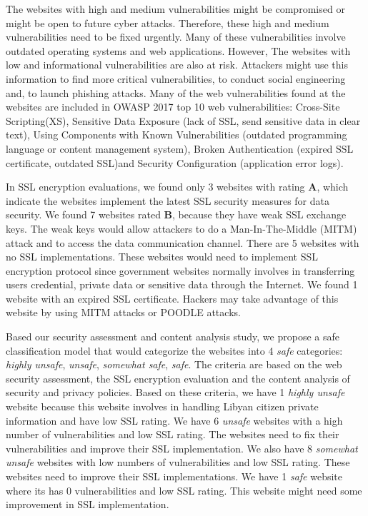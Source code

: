 \documentclass[conference,letterpaper]{IEEEtran}
\begin{document}
The websites with high and medium vulnerabilities might be
compromised or might be open to future cyber attacks.
Therefore, these high and medium vulnerabilities need to be
fixed urgently. Many of these vulnerabilities involve
outdated operating systems and web applications. However,
The websites with low and informational vulnerabilities are
also at risk. Attackers might use this information to find
more critical vulnerabilities, to conduct social engineering
and, to launch phishing attacks. Many of the web
vulnerabilities found at the websites are included in OWASP 2017 top 10 web vulnerabilities: Cross-Site Scripting(XS), Sensitive Data
Exposure (lack of SSL, send sensitive data in clear text),
Using Components with Known Vulnerabilities (outdated
programming language or content management system), Broken
Authentication (expired SSL certificate, outdated SSL)and
Security Configuration (application error logs).

In SSL encryption evaluations, we found only 3 websites with
rating \textbf{A}, which indicate the websites implement the
latest SSL security measures for data security. We found 7
websites rated \textbf{B}, because they have weak SSL
exchange keys. The weak keys would allow attackers to do a
Man-In-The-Middle (MITM) attack and to access the data
communication channel. There are 5 websites with no SSL
implementations. These websites would need to implement SSL
encryption protocol since government websites normally
involves in transferring users credential, private data or
sensitive data through the Internet. We found 1 website with
an expired SSL certificate. Hackers may take advantage of this
website by using MITM attacks or POODLE attacks.

Based our security assessment and content analysis study, we propose
a safe classification model that would categorize the websites into
4 \emph{safe} categories: \emph{highly
	unsafe}, \emph{unsafe}, \emph{somewhat safe}, \emph{safe}.
The criteria are based on the web security assessment, the SSL
encryption evaluation and the content analysis of security and
privacy policies. Based on these criteria, we have 1
\emph{highly unsafe} website because this website involves
in handling Libyan citizen private information and have low
SSL rating. We have 6 \emph{unsafe} websites with a high
number of vulnerabilities and low SSL rating. The websites
need to fix their vulnerabilities and improve their SSL
implementation. We also have 8 \emph{somewhat unsafe}
websites with low numbers of vulnerabilities and low SSL
rating. These websites need to improve their SSL
implementations. We have 1 \emph{safe} website where its has
0 vulnerabilities and low SSL rating. This website might
need some improvement in SSL implementation.  
\end{document}
